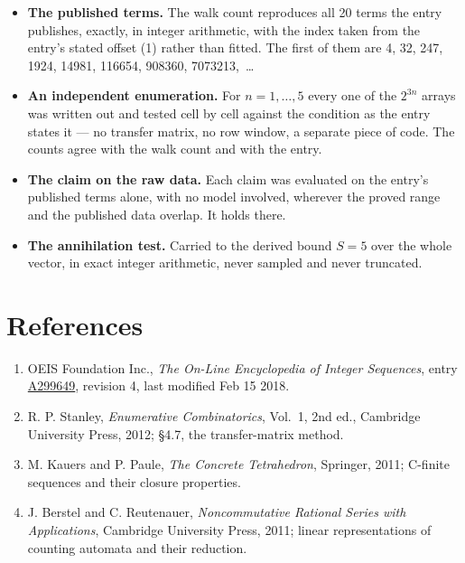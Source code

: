 \documentclass[11pt]{article}
\theoremstyle{definition}
\begin{document}
\begin{itemize}

\item {\bfseries The published terms.} The walk count reproduces all 20 terms the entry publishes, exactly, in integer arithmetic, with the index taken from the entry's stated offset (1) rather than fitted. The first of them are 4, 32, 247, 1924, 14981, 116654, 908360, 7073213,~\dots

\item {\bfseries An independent enumeration.} For $n = 1,\dots,5$ every one of the $2^{3n}$ arrays was written out and tested cell by cell against the condition as the entry states it --- no transfer matrix, no row window, a separate piece of code. The counts agree with the walk count and with the entry.

\item {\bfseries The claim on the raw data.} Each claim was evaluated on the entry's published terms alone, with no model involved, wherever the proved range and the published data overlap. It holds there.

\item {\bfseries The annihilation test.} Carried to the derived bound $S = 5$ over the whole vector, in exact integer arithmetic, never sampled and never truncated.

\end{itemize}

\section{References}

\begin{enumerate}

\item OEIS Foundation Inc., \emph{The On-Line Encyclopedia of Integer Sequences}, entry \href{https://oeis.org/A299649}{A299649}, revision 4, last modified Feb 15 2018.

\item R. P. Stanley, \emph{Enumerative Combinatorics}, Vol.~1, 2nd ed., Cambridge University Press, 2012; \S4.7, the transfer-matrix method.

\item M. Kauers and P. Paule, \emph{The Concrete Tetrahedron}, Springer, 2011; C-finite sequences and their closure properties.

\item J. Berstel and C. Reutenauer, \emph{Noncommutative Rational Series with Applications}, Cambridge University Press, 2011; linear representations of counting automata and their reduction.

\end{enumerate}
\end{document}
